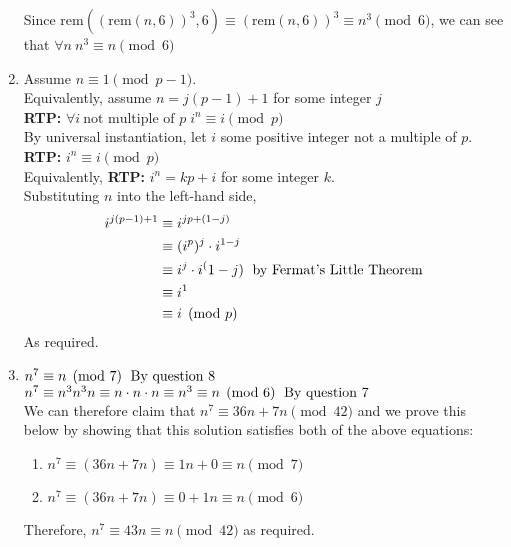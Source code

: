\documentclass{article}
\newcommand{\rtp}{\textbf{RTP: }}
\newcommand{\myforall}[1]{\forall #1 \:}
\newcommand{\rem}[2]{\textrm{rem}(#1, #2)}
\begin{document}
\begin{enumerate}
\begin{table}[H]
\begin{tabular}{|c|c|c|}
                \end{tabular}
                \end{table}
            Since $\rem{(\rem{n}{6})^3}{6} \equiv (\rem{n}{6})^3 \equiv n^3 \pmod{6}$, we can see that $\myforall{n} n^3 \equiv n \pmod{6}$
        \item Assume $n \equiv 1 \pmod{p-1}$. \\
            Equivalently, assume $n = j(p-1) + 1$ for some integer $j$ \\
            \rtp $\myforall{i} \textrm{not multiple of }p\;i^n \equiv i \pmod{p}$ \\
            By universal instantiation, let $i$ some positive integer not a multiple of $p$. \\
            \rtp $i^n \equiv i \pmod{p}$ \\
            Equivalently, \rtp $i^n = kp + i$ for some integer $k$. \\
            Substituting $n$ into the left-hand side,
            \begin{align*}
                i^{j(p-1) + 1} &\equiv i^{jp+ (1-j)} \\
                &\equiv (i^p)^j \cdot i^{1-j} \\
                &\equiv i^j \cdot i^(1-j) \textrm{\; by Fermat's Little Theorem} \\
                &\equiv i^1 \\
                &\equiv i \pmod{p}
            \end{align*}
            As required.
        \item $n^7 \equiv n \pmod 7 \textrm{\; By question 8}$ \\
            $n^7 \equiv n^3n^3n \equiv n\cdot n\cdot n \equiv n^3 \equiv n \pmod 6 \textrm{\; By question 7}$ \\
            We can therefore claim that $n^7 \equiv 36n + 7n \pmod{42}$ and we prove this below by showing that this solution satisfies both of the above equations:
            \begin{enumerate}
                \item $n^7 \equiv (36n + 7n) \equiv 1n + 0 \equiv n \pmod{7}$
                \item $n^7 \equiv (36n + 7n) \equiv 0 + 1n \equiv n \pmod{6}$
            \end{enumerate}
            Therefore, $n^7 \equiv 43n \equiv n \pmod{42}$ as required.
    \end{enumerate}
\end{document}
